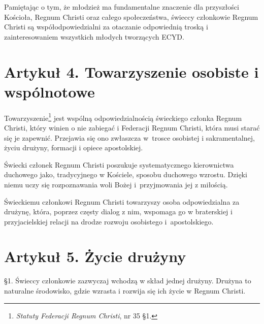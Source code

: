 \filbreak{}

 Pamiętając o tym, że młodzież ma fundamentalne znaczenie dla przyszłości Kościoła, Regnum Christi oraz całego społeczeństwa, świeccy członkowie Regnum Christi są współodpowiedzialni za otaczanie odpowiednią troską i zainteresowaniem wszystkich młodych tworzących ECYD.


\section{Artykuł 4. Towarzyszenie osobiste i wspólnotowe}


 Towarzyszenie\footnote{{\em Statuty Federacji Regnum Christi}, nr 35 \S{}1.} jest wspólną odpowiedzialnością świeckiego członka Regnum Christi, który winien o nie zabiegać i Federacji Regnum Christi, która musi starać się je zapewnić. Przejawia się ono zwłaszcza \mbox{w trosce} osobistej i sakramentalnej, życiu drużyny, formacji i opiece apostolskiej.


 Świecki członek Regnum Christi poszukuje systematycznego kierownictwa duchowego jako, tradycyjnego w Kościele, sposobu duchowego wzrostu. Dzięki niemu uczy się rozpoznawania woli Bożej \mbox{i przyjmowania} jej z miłością. 

\filbreak{}

 Świeckiemu członkowi Regnum Christi towarzyszy osoba odpowiedzialna za drużynę, która, poprzez częsty dialog z nim, wspomaga go w braterskiej i przyjacielskiej relacji na drodze rozwoju osobistego \mbox{i apostolskiego}.


\section{Artykuł 5. Życie drużyny}


 \S{}1. Świeccy członkowie zazwyczaj wchodzą w skład jednej drużyny. Drużyna to naturalne środowisko, gdzie wzrasta i rozwija się ich życie w Regnum Christi.

